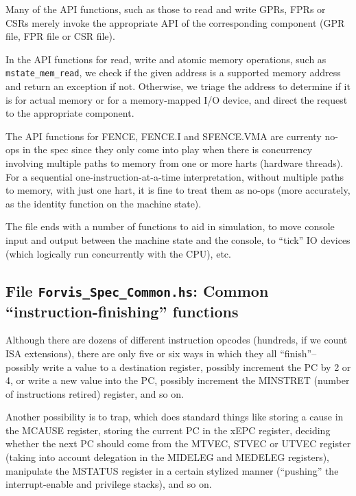 \documentclass[11pt]{article}
\begin{document}
Many of the API functions, such as those to read and write GPRs, FPRs
or CSRs merely invoke the appropriate API of the corresponding
component (GPR file, FPR file or CSR file).

In the API functions for read, write and atomic memory operations,
such as \verb|mstate_mem_read|, we check if the given address is a
supported memory address and return an exception if not.  Otherwise,
we triage the address to determine if it is for actual memory or for a
memory-mapped I/O device, and direct the request to the appropriate
component.

The API functions for FENCE, FENCE.I and SFENCE.VMA are currenty
no-ops in the spec since they only come into play when there is
concurrency involving multiple paths to memory from one or more harts
(hardware threads).  For a sequential one-instruction-at-a-time
interpretation, without multiple paths to memory, with just one hart,
it is fine to treat them as no-ops (more accurately, as the identity
function on the machine state).

The file ends with a number of functions to aid in simulation, to move
console input and output between the machine state and the console, to
``tick'' IO devices (which logically run concurrently with the CPU), etc.


\subsection{File {\tt Forvis\_Spec\_Common.hs}: Common ``instruction-finishing'' functions}

\label{sec_standard_finish_functions}

Although there are dozens of different instruction opcodes (hundreds,
if we count ISA extensions), there are only five or six ways in which
they all ``finish''-- possibly write a value to a destination
register, possibly increment the PC by 2 or 4, or write a new value
into the PC, possibly increment the MINSTRET (number of instructions
retired) register, and so on.

Another possibility is to trap, which does standard things like
storing a cause in the MCAUSE register, storing the current PC in the
xEPC register, deciding whether the next PC should come from the
MTVEC, STVEC or UTVEC register (taking into account delegation in the
MIDELEG and MEDELEG registers), manipulate the MSTATUS register in a
certain stylized manner (``pushing'' the interrupt-enable and
privilege stacks), and so on.
\end{document}
